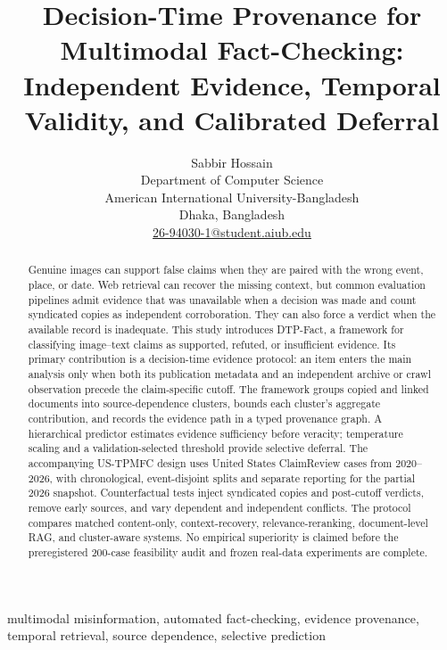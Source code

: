 \documentclass[journal]{IEEEtran}
\title{Decision-Time Provenance for Multimodal Fact-Checking: Independent Evidence, Temporal Validity, and Calibrated Deferral}
\author{Sabbir Hossain\\
\small Department of Computer Science\\
\small American International University-Bangladesh\\
\small Dhaka, Bangladesh\\
\small \href{mailto:26-94030-1@student.aiub.edu}{26-94030-1@student.aiub.edu}}
\newcommand{\systemname}{DTP-Fact}
\newcommand{\datasetname}{US-TPMFC}
\begin{document}
\maketitle

\begin{abstract}
Genuine images can support false claims when they are paired with the wrong event, place, or date. Web retrieval can recover the missing context, but common evaluation pipelines admit evidence that was unavailable when a decision was made and count syndicated copies as independent corroboration. They can also force a verdict when the available record is inadequate. This study introduces \systemname{}, a framework for classifying image--text claims as supported, refuted, or insufficient evidence. Its primary contribution is a decision-time evidence protocol: an item enters the main analysis only when both its publication metadata and an independent archive or crawl observation precede the claim-specific cutoff. The framework groups copied and linked documents into source-dependence clusters, bounds each cluster's aggregate contribution, and records the evidence path in a typed provenance graph. A hierarchical predictor estimates evidence sufficiency before veracity; temperature scaling and a validation-selected threshold provide selective deferral. The accompanying \datasetname{} design uses United States ClaimReview cases from 2020--2026, with chronological, event-disjoint splits and separate reporting for the partial 2026 snapshot. Counterfactual tests inject syndicated copies and post-cutoff verdicts, remove early sources, and vary dependent and independent conflicts. The protocol compares matched content-only, context-recovery, relevance-reranking, document-level RAG, and cluster-aware systems. No empirical superiority is claimed before the preregistered 200-case feasibility audit and frozen real-data experiments are complete.
\end{abstract}

\begin{IEEEkeywords}
multimodal misinformation, automated fact-checking, evidence provenance, temporal retrieval, source dependence, selective prediction
\end{IEEEkeywords}












\end{document}
